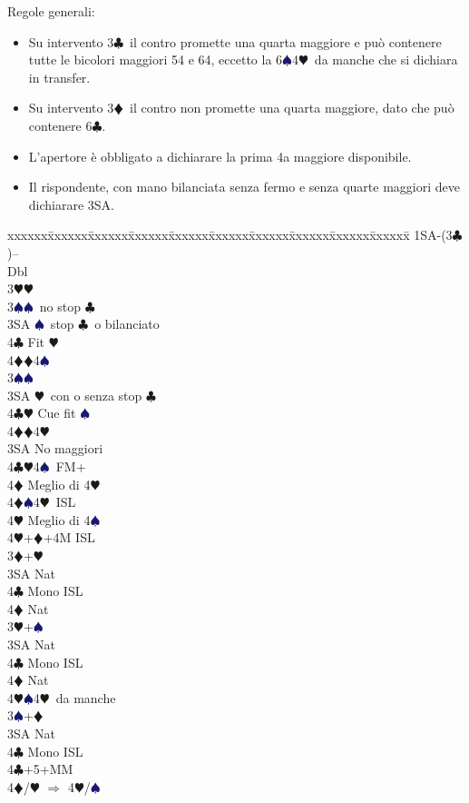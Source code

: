 \documentclass[a4paper,italian]{article}
\newcommand{\BC}{\textcolor{OliveGreen}{$\clubsuit$}}
\newcommand{\BD}{\textcolor{RedOrange}{$\vardiamondsuit$}}
\newcommand{\BH}{\textcolor{Red2}{$\varheartsuit${}}}
\newcommand{\BS}{\textcolor{MidnightBlue}{$\spadesuit${}}}
\newenvironment{bidtable}
{\begin{tabbing}

    xxxxxx\=xxxxxx\=xxxxxx\=xxxxxx\=xxxxxx\=xxxxxx\=xxxxxx\=xxxxxx\=xxxxxx\=xxxxxx\=\kill}
{\end{tabbing} }%
\begin{document}
\begin{multicols}{2}
    Regole generali:
    \begin{itemize}
        \item Su intervento 3\BC\ il contro promette una quarta maggiore e può contenere tutte le bicolori maggiori 54 e 64, eccetto la 6\BS 4\BH\ da manche che si dichiara in transfer.
        \item Su intervento 3\BD\ il contro non promette una quarta maggiore, dato che può contenere 6\BC .
        \item L'apertore è obbligato a dichiarare la prima 4a maggiore disponibile.
        \item Il rispondente, con mano bilanciata senza fermo e senza quarte maggiori deve dichiarare 3SA.

    \end{itemize}
    \begin{bidtable}
        1SA-(3\BC)--\+\\
        Dbl\+\\
        3\BH {}\BH \+\\
        3\BS {}\BS\ no stop \BC \\
        3SA \BS\ stop \BC\ o bilanciato\\
        4\BC \> Fit \BH \\
        4\BD {}\BD 4\BS \-\\
        3\BS {}\BS \+\\
        3SA \BH\ con o senza stop \BC \\
        4\BC\BH \> Cue fit \BS \\
        4\BD {}\BD 4\BH \-\\
        3SA \> No maggiori\+\\
        4\BC {}\BH 4\BS\ FM+\+\\
        4\BD \> Meglio di 4\BH \-\\
        4\BD {}\BS 4\BH\ ISL\+\\
        4\BH \> Meglio di 4\BS \-\\
        4\BH {}+\BD +4M ISL\-\-\\
        3\BD {}+\BH \+\\
        3SA \> Nat\+\\
        4\BC \> Mono ISL\\
        4\BD \> Nat\-\-\\
        3\BH {}+\BS \+\\
        3SA \> Nat\+\\
        4\BC \> Mono ISL\\
        4\BD \> Nat\\
        4\BH {}\BS 4\BH\ da manche\-\-\\
        3\BS {}+\BD \+\\
        3SA \> Nat\+\\
        4\BC \> Mono ISL\-\-\\
        4\BC {}+5+MM\\
        4\BD/\BH \> $\Rightarrow$ 4\BH /\BS \-
    \end{bidtable}
    \columnbreak


\end{multicols}
\end{document}
